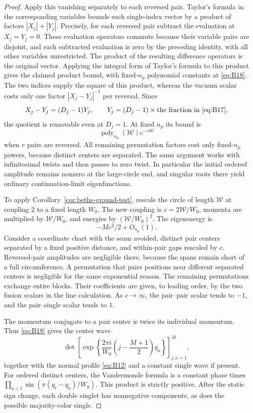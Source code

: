 \begin{proof}
Apply this vanishing separately to each reversed pair.  Taylor's
formula in the corresponding variables bounds each single-index
vector by a product of factors $|X_j|+|Y_j|$.
Precisely, for each reversed pair subtract the evaluation at
$X_j=Y_j=0$.  These evaluation operators commute because their variable
pairs are disjoint, and each subtracted evaluation is zero by the
preceding identity, with all other variables unrestricted.  The product
of the resulting difference operators is the original vector.  Applying
the integral form of Taylor's formula to this product gives the claimed
product bound, with fixed-$n_p$ polynomial constants at
\eqref{eq:B18}.  The two indices supply
the square of this product, whereas the vacuum scalar costs only one
factor $|X_j-Y_j|^{-1}$ per reversal.  Since
\[
 X_j-Y_j=(D_j-1)Y_j,
 \qquad
 Y_j=(D_j-1)\times\hbox{the fraction in \eqref{eq:B17}},
\]
the quotient is removable even at $D_j=1$.  At fixed $n_p$ its bound is
\[
 \operatorname{poly}_{n_p}(\mathcal W)e^{-r\mathcal W}
\]
when $r$ pairs are reversed.  All remaining permutation factors cost
only fixed-$n_p$ powers, because distinct centers are separated.
The same argument works with infinitesimal twists and then passes
to zero twist.  In particular the initial ordered amplitude remains
nonzero at the large-circle end, and singular roots there yield ordinary
continuation-limit eigenfunctions.

To apply Corollary~\ref{cor:bethe-ground-test}, rescale the circle of
length $\mathcal W$ at coupling $2$ to a fixed length $W_0$.
The new coupling is $c=2\mathcal W/W_0$, momenta are multiplied by
$\mathcal W/W_0$, and energies by $(\mathcal W/W_0)^2$.
The eigenenergy is
\[
 -Mc^2/2+O_{n_p}(1).
\]
Consider a coordinate chart with the seam avoided, distinct pair centers
separated by a fixed positive distance, and within-pair gaps rescaled
by $c$.  Reversed-pair amplitudes are negligible there, because the
spans remain short of a full circumference.  A permutation that pairs
positions near different separated centers is negligible for the same
exponential reason.  The remaining permutations exchange entire blocks.
Their coefficients are given, to leading order, by the two fusion
scalars in the line calculation.  As $c\to\infty$, the pair--pair scalar
tends to $-1$, and the pair--single scalar tends to $1$.

The momentum conjugate to a pair center is twice its individual momentum.
Thus \eqref{eq:B18} gives the center wave
\[
 \det\left[
   \exp\!\left\{\frac{2\pi i}{W_0}
        \left(j-\frac{M+1}{2}\right)q_a\right\}
     \right]_{j,a=1}^M,
\]
together with the normal profile \eqref{eq:B12} and a constant single
wave if present.  For ordered distinct centers, the Vandermonde formula
is a constant phase times
$\prod_{a<t}\sin(\pi(q_t-q_a)/W_0)$.  This product is strictly positive.
After the static sign change, each double singlet has nonnegative components,
as does the possible majority-color single.


\end{proof}
